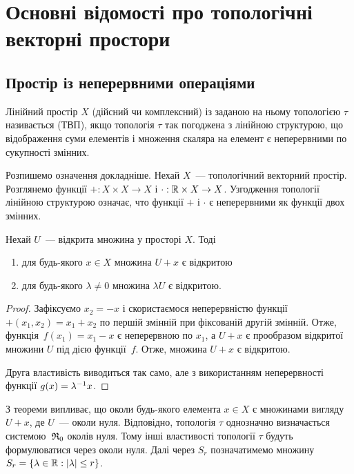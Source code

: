 \newcommand{\AdditionFunction}{+}
\newcommand{\MultiplicationFunction}{\cdot}

\chapter{Основні відомості про топологічні векторні простори}

\section{Простір із неперервними операціями}

\begin{definition}
    Лінійний простір $X$ (дійсний чи комплексний) із заданою на ньому топологією $\tau$ називається  (ТВП), якщо топологія $\tau$ так погоджена з лінійною структурою, що відображення суми елементів і множення скаляра на елемент є неперервними по сукупності змінних.
\end{definition}

Розпишемо означення докладніше. Нехай $X$~--- топологічний векторний простір. Розглянемо функції $\AdditionFunction: X \times X \to X$ і $\MultiplicationFunction: \RR \times X \to X$. Узгодження топології лінійною структурою означає, что функції $+$ і $\cdot$ є неперервними як функції двох змінних.

\begin{theorem}
    Нехай $U$~--- відкрита множина у просторі $X$. Тоді
    \begin{enumerate}
        \item для будь-якого $x \in X$ множина $U + x$ є відкритою
        \item для будь-якого $\lambda \ne 0$ множина $\lambda U$ є відкритою.
    \end{enumerate}
\end{theorem}

\begin{proof}
    Зафіксуємо $x_2 = -x$ і скористаємося неперервністю функції~$\AdditionFunction (x_1, x_2) = x_1 + x_2$ по першій змінній при фіксованій другій змінній. Отже, функція~$f(x_1) = x_1 - x$ є неперервною по $x_1$, а $U + x$ є прообразом відкритої множини $U$ під дією функції~$f$. Отже, множина $U + x$ є відкритою.

    Друга властивість виводиться так само, але з використанням неперервності функції $g(x) = \lambda\inv x$.
\end{proof}

З теореми випливає, що околи будь-якого елемента $x \in X$ є множинами вигляду~$U + x$, де $U$~--- околи нуля. Відповідно, топологія $\tau$ однозначно визначається системою~$\frak R_0$ околів нуля. Тому інші властивості топології $\tau$ будуть формулюватися через околи нуля. Далі через $S_r$ позначатимемо множину $S_r = \{\lambda \in \RR: |\lambda| \le r\}$.

